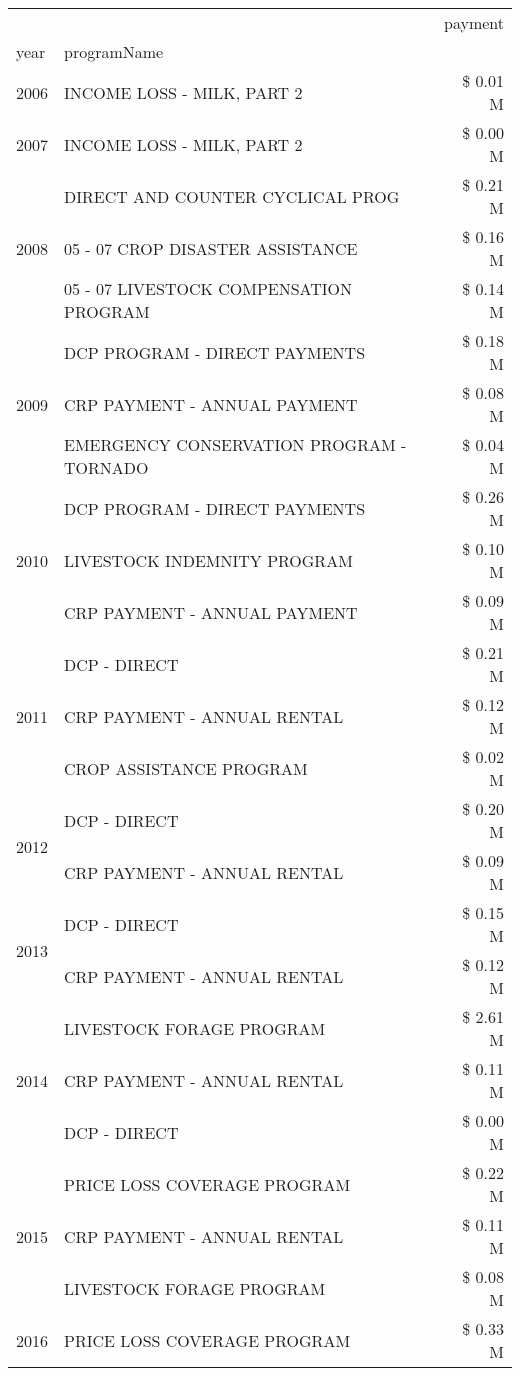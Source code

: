 \begin{tabular}{llr}
\toprule
 &  & payment \\
year & programName &  \\
\midrule
2006 & INCOME LOSS - MILK, PART 2 & \$ 0.01 M \\
\cline{1-3}
2007 & INCOME LOSS - MILK, PART 2 & \$ 0.00 M \\
\cline{1-3}
\multirow[t]{3}{*}{2008} & DIRECT AND COUNTER CYCLICAL PROG & \$ 0.21 M \\
 & 05 - 07 CROP DISASTER ASSISTANCE & \$ 0.16 M \\
 & 05 - 07 LIVESTOCK COMPENSATION PROGRAM & \$ 0.14 M \\
\cline{1-3}
\multirow[t]{3}{*}{2009} & DCP PROGRAM - DIRECT PAYMENTS & \$ 0.18 M \\
 & CRP PAYMENT - ANNUAL PAYMENT & \$ 0.08 M \\
 & EMERGENCY CONSERVATION PROGRAM - TORNADO & \$ 0.04 M \\
\cline{1-3}
\multirow[t]{3}{*}{2010} & DCP PROGRAM - DIRECT PAYMENTS & \$ 0.26 M \\
 & LIVESTOCK INDEMNITY PROGRAM & \$ 0.10 M \\
 & CRP PAYMENT - ANNUAL PAYMENT & \$ 0.09 M \\
\cline{1-3}
\multirow[t]{3}{*}{2011} & DCP - DIRECT & \$ 0.21 M \\
 & CRP PAYMENT - ANNUAL RENTAL & \$ 0.12 M \\
 & CROP ASSISTANCE PROGRAM & \$ 0.02 M \\
\cline{1-3}
\multirow[t]{2}{*}{2012} & DCP - DIRECT & \$ 0.20 M \\
 & CRP PAYMENT - ANNUAL RENTAL & \$ 0.09 M \\
\cline{1-3}
\multirow[t]{2}{*}{2013} & DCP - DIRECT & \$ 0.15 M \\
 & CRP PAYMENT - ANNUAL RENTAL & \$ 0.12 M \\
\cline{1-3}
\multirow[t]{3}{*}{2014} & LIVESTOCK FORAGE PROGRAM & \$ 2.61 M \\
 & CRP PAYMENT - ANNUAL RENTAL & \$ 0.11 M \\
 & DCP - DIRECT & \$ 0.00 M \\
\cline{1-3}
\multirow[t]{3}{*}{2015} & PRICE LOSS COVERAGE PROGRAM & \$ 0.22 M \\
 & CRP PAYMENT - ANNUAL RENTAL & \$ 0.11 M \\
 & LIVESTOCK FORAGE PROGRAM & \$ 0.08 M \\
\cline{1-3}
\multirow[t]{3}{*}{2016} & PRICE LOSS COVERAGE PROGRAM                   & \$ 0.33 M \\

\end{tabular}
